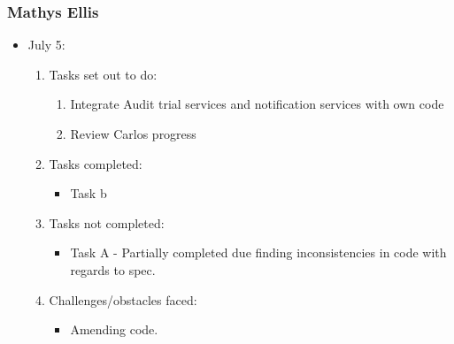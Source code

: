 \subsubsection{Mathys Ellis}
	\begin{itemize}
		\item July 5:
		\begin{enumerate}
			\item Tasks set out to do:
			\begin{enumerate}
				\item Integrate Audit trial services and notification services with own code
				\item Review Carlos progress
			\end{enumerate}
			\item Tasks completed:
			\begin{itemize}
				\item Task b
			\end{itemize}
			\item Tasks not completed:
			\begin{itemize}
				\item Task A - Partially completed due finding inconsistencies in code with regards to spec. 
			\end{itemize}
			\item Challenges/obstacles faced:
			\begin{itemize}
				\item Amending code.
			\end{itemize}			
		\end{enumerate}
	\end{itemize}
	
